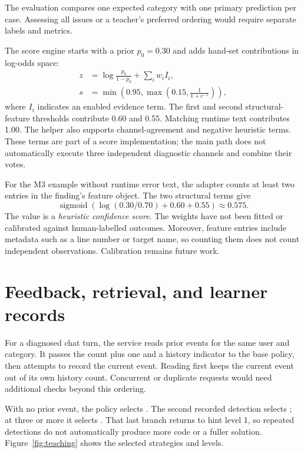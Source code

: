 The evaluation compares one expected category with one primary prediction per case. Assessing all issues or a teacher's preferred ordering would require separate labels and metrics.

The score engine starts with a prior $p_0=0.30$ and adds hand-set contributions in log-odds space:
\begin{align}
z &= \log\frac{p_0}{1-p_0}+\sum_i w_i I_i,\\
s &= \min\left(0.95,\max\left(0.15,\frac{1}{1+e^{-z}}\right)\right),
\end{align}
where $I_i$ indicates an enabled evidence term. The first and second structural-feature thresholds contribute 0.60 and 0.55. Matching runtime text contributes 1.00. The helper also supports channel-agreement and negative heuristic terms. These terms are part of a score implementation; the main path does not automatically execute three independent diagnostic channels and combine their votes.

For the M3 example without runtime error text, the adapter counts at least two entries in the finding's feature object. The two structural terms give
\begin{equation}
\operatorname{sigmoid}\left(\log(0.30/0.70)+0.60+0.55\right)\approx0.575.
\end{equation}
The value is a \emph{heuristic confidence score}. The weights have not been fitted or calibrated against human-labelled outcomes. Moreover, feature entries include metadata such as a line number or target name, so counting them does not count independent observations. Calibration remains future work.

\section{Feedback, retrieval, and learner records}
\label{sec:pedagogy}
For a diagnosed chat turn, the service reads prior events for the same user and category. It passes the count plus one and a history indicator to the base policy, then attempts to record the current event. Reading first keeps the current event out of its own history count. Concurrent or duplicate requests would need additional checks beyond this ordering.

With no prior event, the policy selects . The second recorded detection selects ; at three or more it selects . That last branch returns to hint level 1, so repeated detections do not automatically produce more code or a fuller solution. Figure~\ref{fig:teaching} shows the selected strategies and levels.

